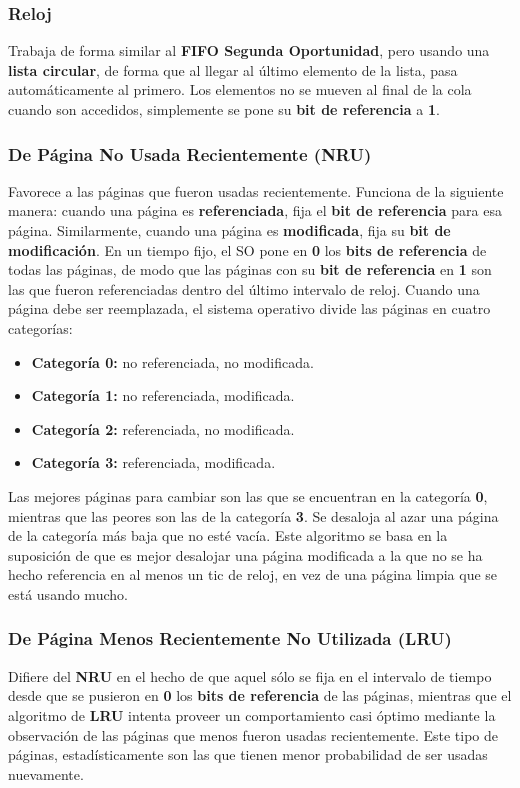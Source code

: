 \documentclass[10pt,a4paper]{article}
\begin{document}
\subsubsection{Reloj}
Trabaja de forma similar al \textbf{FIFO Segunda Oportunidad}, pero usando una \textbf{lista circular}, de forma que al llegar al último elemento de la lista, pasa automáticamente al primero. Los elementos no se mueven al final de la cola cuando son accedidos, simplemente se pone su \textbf{bit de referencia} a \textbf{1}. 

\subsubsection{De Página No Usada Recientemente (NRU)}
Favorece a las páginas que fueron usadas recientemente. Funciona de la siguiente manera: cuando una página es \textbf{referenciada}, fija el \textbf{bit de referencia} para esa página. Similarmente, cuando una página es \textbf{modificada}, fija su \textbf{bit de modificación}. En un tiempo fijo, el SO pone en \textbf{0} los \textbf{bits de referencia} de todas las páginas, de modo que las páginas con su \textbf{bit de referencia} en \textbf{1} son las que fueron referenciadas dentro del último intervalo de reloj. Cuando una página debe ser reemplazada, el sistema operativo divide las páginas en cuatro categorías:

\begin{itemize}
\item \textbf{Categoría 0:} no referenciada, no modificada.
\item \textbf{Categoría 1:} no referenciada, modificada.
\item \textbf{Categoría 2:} referenciada, no modificada.
\item \textbf{Categoría 3:} referenciada, modificada.
\end{itemize}

Las mejores páginas para cambiar son las que se encuentran en la categoría \textbf{0}, mientras que las peores son las de la categoría \textbf{3}. Se desaloja al azar una página de la categoría más baja que no esté vacía. Este algoritmo se basa en la suposición de que es mejor desalojar una página modificada a la que no se ha hecho referencia en al menos un tic de reloj, en vez de una página limpia que se está usando mucho.

\subsubsection{De Página Menos Recientemente No Utilizada (LRU)}
Difiere del \textbf{NRU} en el hecho de que aquel sólo se fija en el intervalo de tiempo desde que se pusieron en \textbf{0} los \textbf{bits de referencia} de las páginas, mientras que el algoritmo de \textbf{LRU} intenta proveer un comportamiento casi óptimo mediante la observación de las páginas que menos fueron usadas recientemente. Este tipo de páginas, estadísticamente son las que tienen menor probabilidad de ser usadas nuevamente.
\end{document}
